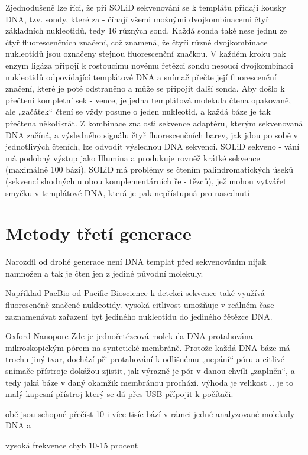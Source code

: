 \documentclass[czech,DP]{thesiskiv}
\begin{document}
 Zjednodušeně lze říci,
že při SOLiD sekvenování se k templátu
přidají kousky DNA, tzv. sondy, které za -
čínají všemi možnými dvojkombinacemi
čtyř základních nukleotidů, tedy 16 různých sond. Každá sonda také nese jednu ze
čtyř fluorescenčních značení, což znamená, že čtyři různé dvojkombinace nukleotidů jsou označeny stejnou fluorescenční
značkou. V každém kroku pak enzym ligáza připojí k rostoucímu novému řetězci
sondu nesoucí dvojkombinaci nukleotidů odpovídající templátové DNA a snímač
přečte její fluorescenční značení, které je
poté odstraněno a může se připojit další
sonda. Aby došlo k přečtení kompletní sek -
vence, je jedna templátová molekula čtena
opakovaně, ale „začátek“ čtení se vždy
posune o jeden nukleotid, a každá báze je
tak přečtena několikrát. Z kombinace znalosti sekvence adaptéru, kterým sekvenovaná DNA začíná, a výsledného signálu
čtyř fluorescenčních barev, jak jdou po
sobě v jednotlivých čteních, lze odvodit
výslednou DNA sekvenci. SOLiD sekveno -
vání má podobný výstup jako Illumina
a produkuje rovněž krátké sekvence (maximálně 100 bází). SOLiD má problémy se
čtením palindromatických úseků (sekvencí shodných u obou komplementárních ře -
tězců), jež mohou vytvářet smyčku v templátové DNA, která je pak nepřístupná pro
nasednutí 

\section{Metody třetí generace}
Narozdíl od drohé generace není DNA templat před sekvenováním nijak namnožen a tak je čten jen z jediné původní molekuly.

Například PacBio od Pacific Bioscience
k detekci sekvence také využívá fluoresenčně značené nukleotidy. 
vysoká citlivost umožňuje v reálném čase zaznamenávat zařazení byť jediného nukleotidu do jediného řětězce DNA.

Oxford Nanopore
 Zde je jednořetězcová molekula DNA protahována mikroskopickým pórem na syntetické membráně.
Protože každá DNA báze má trochu jiný
tvar, dochází při protahování k odlišnému
„ucpání“ póru a citlivé snímače přístroje
dokážou zjistit, jak výrazně je pór v danou
chvíli „zaplněn“, a tedy jaká báze v daný
okamžik membránou prochází.
výhoda je velikost .. je to malý kapesní přístroj který se dá přes USB přípojit k počítači. 

obě jsou schopné přečíst 10 i více tisíc bází v rámci jedné analyzované molekuly DNA a 

vysoká frekvence chyb 10-15 procent
\end{document}
